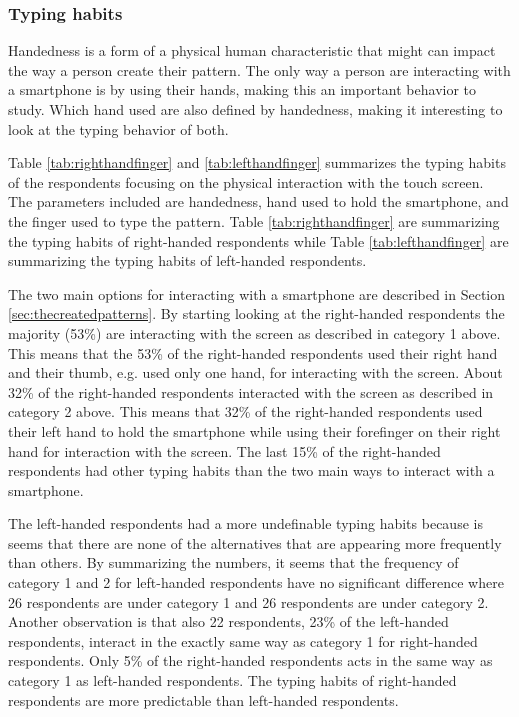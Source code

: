     \subsubsection{Typing habits}

      Handedness is a form of a physical human characteristic that might can impact the way a person create their pattern. The only way a person are interacting with a smartphone is by using their hands, making this an important behavior to study. Which hand used are also defined by handedness, making it interesting to look at the typing behavior of both. 

      Table \ref{tab:righthandfinger} and \ref{tab:lefthandfinger} summarizes the typing habits of the respondents focusing on the physical interaction with the touch screen. The parameters included are handedness, hand used to hold the smartphone, and the finger used to type the pattern. Table \ref{tab:righthandfinger} are summarizing the typing habits of right-handed respondents while Table \ref{tab:lefthandfinger} are summarizing the typing habits of left-handed respondents.

      The two main options for interacting with a smartphone are described in Section \ref{sec:thecreatedpatterns}. By starting looking at the right-handed respondents the majority (53\%) are interacting with the screen as described in category 1 above. This means that the 53\% of the right-handed respondents used their right hand and their thumb, e.g. used only one hand, for interacting with the screen. About 32\% of the right-handed respondents interacted with the screen as described in category 2 above. This means that 32\% of the right-handed respondents used their left hand to hold the smartphone while using their forefinger on their right hand for interaction with the screen. The last 15\% of the right-handed respondents had other typing habits than the two main ways to interact with a smartphone.

      The left-handed respondents had a more undefinable typing habits because is seems that there are none of the alternatives that are appearing more frequently than others. By summarizing the numbers, it seems that the frequency of category 1 and 2 for left-handed respondents have no significant difference where 26 respondents are under category 1 and 26 respondents are under category 2. Another observation is that also 22 respondents, 23\% of the left-handed respondents, interact in the exactly same way as category 1 for right-handed respondents. Only 5\% of the right-handed respondents acts in the same way as category 1 as left-handed respondents. The typing habits of right-handed respondents are more predictable than left-handed respondents. 

